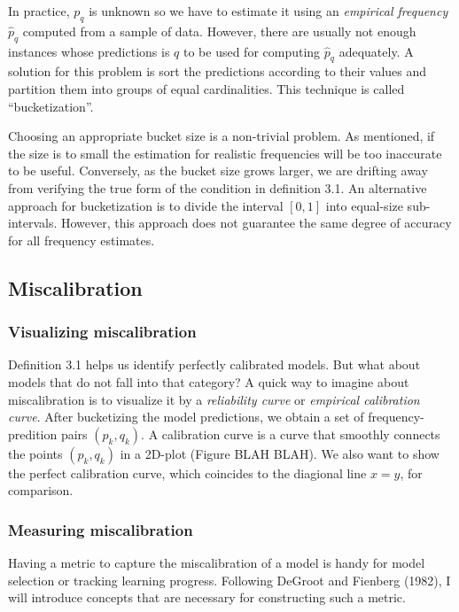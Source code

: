 In practice, $p_q$ is unknown so we have to estimate it using an \textit{empirical frequency} $\hat{p}_q$ computed from a sample of data. However, there are usually not enough instances whose predictions is $q$ to be used for computing $\hat{p}_q$ adequately. A solution for this problem is sort the predictions according to their values and partition them into groups of equal cardinalities. This technique is called ``bucketization''. 

Choosing an appropriate bucket size is a non-trivial problem. As mentioned, if the size is to small the estimation for realistic frequencies will be too inaccurate to be useful. Conversely, as the bucket size grows larger, we are drifting away from verifying the true form of the condition in definition 3.1. An alternative approach for bucketization is to divide the interval $[0, 1]$ into equal-size sub-intervals. However, this approach does not guarantee the same degree of accuracy for all frequency estimates.    

\subsection{Miscalibration}

\subsubsection{Visualizing miscalibration}

Definition 3.1 helps us identify perfectly calibrated models. But what about models that do not fall into that category? A quick way to imagine about miscalibration is to visualize it by a \textit{reliability curve} or \textit{empirical calibration curve}. After bucketizing the model predictions, we obtain a set of frequency-predition pairs $(p_k, q_k)$. A calibration curve is a curve that smoothly connects the points $(p_k, q_k)$ in a 2D-plot (Figure BLAH BLAH). We also want to show the perfect calibration curve, which coincides to the diagional line $x=y$, for comparison. 

\subsubsection{Measuring miscalibration}

Having a metric to capture the miscalibration of a model is handy for model selection or tracking learning progress. Following DeGroot and Fienberg (1982), I will introduce concepts that are necessary for constructing such a metric.

